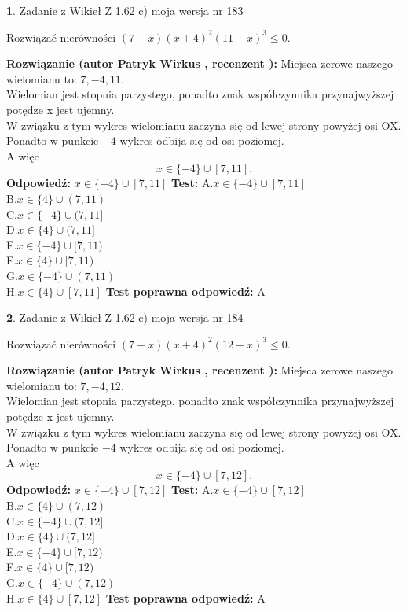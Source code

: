 \documentclass[12pt, a4paper]{article}
\theoremstyle{definition} %
\newtheorem{zad}{}
\newcommand{\zadStart}[1]{\begin{zad}#1\newline}
\newcommand{\zadStop}{\end{zad}}
\newcommand{\rozwStart}[2]{\noindent \textbf{Rozwiązanie (autor #1 , recenzent #2): }\newline}
\newcommand{\rozwStop}{\newline}
\newcommand{\odpStart}{\noindent \textbf{Odpowiedź:}\newline}
\newcommand{\odpStop}{\newline}
\newcommand{\testStart}{\noindent \textbf{Test:}\newline}
\newcommand{\testStop}{\newline}
\newcommand{\kluczStart}{\noindent \textbf{Test poprawna odpowiedź:}\newline}
\newcommand{\kluczStop}{\newline}
\begin{document}
\zadStart{Zadanie z Wikieł Z 1.62 c) moja wersja nr 183}

Rozwiązać nierówności $(7-x)(x+4)^{2}(11-x)^{3}\le0$.
\zadStop
\rozwStart{Patryk Wirkus}{}
Miejsca zerowe naszego wielomianu to: $7, -4, 11$.\\
Wielomian jest stopnia parzystego, ponadto znak współczynnika przy\linebreak najwyższej potędze x jest ujemny.\\ W związku z tym wykres wielomianu zaczyna się od lewej strony powyżej osi OX.\\
Ponadto w punkcie $-4$ wykres odbija się od osi poziomej.\\
A więc $$x \in \{-4\} \cup [7,11].$$
\rozwStop
\odpStart
$x \in \{-4\} \cup [7,11]$
\odpStop
\testStart
A.$x \in \{-4\} \cup [7,11]$\\
B.$x \in \{4\} \cup (7,11)$\\
C.$x \in \{-4\} \cup (7,11]$\\
D.$x \in \{4\} \cup (7,11]$\\
E.$x \in \{-4\} \cup [7,11)$\\
F.$x \in \{4\} \cup [7,11)$\\
G.$x \in \{-4\} \cup (7,11)$\\
H.$x \in \{4\} \cup [7,11]$
\testStop
\kluczStart
A
\kluczStop



\zadStart{Zadanie z Wikieł Z 1.62 c) moja wersja nr 184}

Rozwiązać nierówności $(7-x)(x+4)^{2}(12-x)^{3}\le0$.
\zadStop
\rozwStart{Patryk Wirkus}{}
Miejsca zerowe naszego wielomianu to: $7, -4, 12$.\\
Wielomian jest stopnia parzystego, ponadto znak współczynnika przy\linebreak najwyższej potędze x jest ujemny.\\ W związku z tym wykres wielomianu zaczyna się od lewej strony powyżej osi OX.\\
Ponadto w punkcie $-4$ wykres odbija się od osi poziomej.\\
A więc $$x \in \{-4\} \cup [7,12].$$
\rozwStop
\odpStart
$x \in \{-4\} \cup [7,12]$
\odpStop
\testStart
A.$x \in \{-4\} \cup [7,12]$\\
B.$x \in \{4\} \cup (7,12)$\\
C.$x \in \{-4\} \cup (7,12]$\\
D.$x \in \{4\} \cup (7,12]$\\
E.$x \in \{-4\} \cup [7,12)$\\
F.$x \in \{4\} \cup [7,12)$\\
G.$x \in \{-4\} \cup (7,12)$\\
H.$x \in \{4\} \cup [7,12]$
\testStop
\kluczStart
A
\kluczStop
\end{document}
